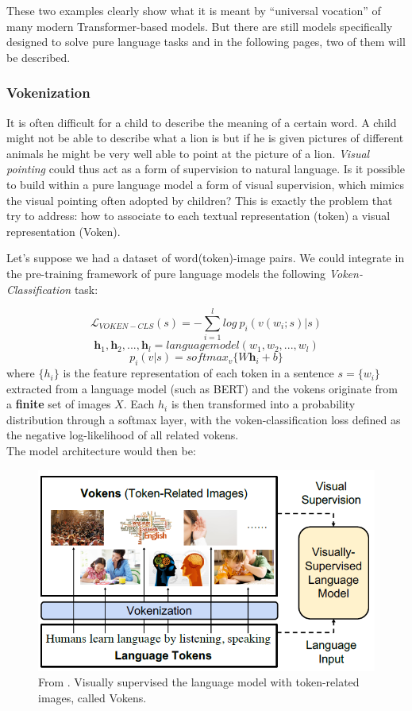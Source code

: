 \documentclass[
]{krantz}
\begin{document}
These two examples clearly show what it is meant by ``universal vocation'' of many modern Transformer-based models. But there are still models specifically designed to solve pure language tasks and in the following pages, two of them will be described.

\hypertarget{vokenization}{%
\subsubsection{Vokenization}\label{vokenization}}

It is often difficult for a child to describe the meaning of a certain word. A child might not be able to describe what a lion is but if he is given pictures of different animals he might be very well able to point at the picture of a lion. \emph{Visual pointing} could thus act as a form of supervision to natural language. Is it possible to build within a pure language model a form of visual supervision, which mimics the visual pointing often adopted by children? This is exactly the problem that \citet{tan2020vokenization} try to address: how to associate to each textual representation (token) a visual representation (Voken).

Let's suppose we had a dataset of word(token)-image pairs. We could integrate in the pre-training framework of pure language models the following \emph{Voken-Classification} task:

\[\mathcal{L}_{VOKEN-CLS}(s)=-\sum_{i=1}^{l}log\ p_{i}(v(w_{i};s)|s) \]
\[\textbf{h}_{1}, \textbf{h}_{2},...,\textbf{h}_{l}=languagemodel(w_{1},w_{2},...,w_{l}) \]
\[p_{i}(v|s)=softmax_{v}\{W\textbf{h}_{i}+b\}\]
where \(\{h_i\}\) is the feature representation of each token in a sentence \(s=\{w_i\}\) extracted from a language model (such as BERT) and the vokens originate from a \textbf{finite} set of images \(X\). Each \(h_i\) is then transformed into a probability distribution through a softmax layer, with the voken-classification loss defined as the negative log-likelihood of all related vokens.\\
The model architecture would then be:

\begin{figure}

{\centering \includegraphics[width=0.7\linewidth]{figures/02-03-img-support-text/img-tan2020-04} 

}

\caption{From \citet{tan2020vokenization}. Visually supervised the language model with token-related images, called Vokens.}\label{fig:img-tan2020-04}
\end{figure}
\end{document}
